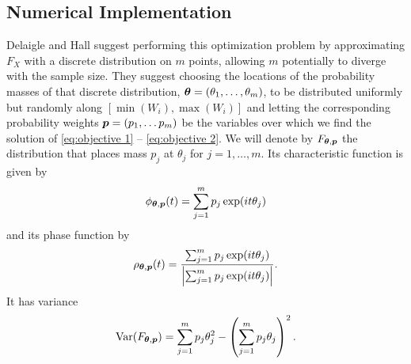	

	

	\subsection{Numerical Implementation}

	Delaigle and Hall \cite{Delaigle2016-la} suggest performing this optimization problem by approximating $F_X$ with a discrete distribution on $m$ points, allowing $m$ potentially to diverge with the sample size. They suggest choosing the locations of the probability masses of that discrete distribution, ${\bm{{\theta}}} = (\theta_1, \dots, \theta_m)$, to be distributed uniformly but randomly along $[\min(W_i), \max(W_i)]$ and letting the corresponding probability weights ${\bm{{p}}} = (p_1, \dots p_m)$ be the variables over which we find the solution of \eqref{eq:objective 1} -- \eqref{eq:objective 2}. We will denote by $F_{{\bm{{\theta}}}, {\bm{{p}}}}$ the distribution that places mass $p_j$ at $\theta_j$ for $j = 1,\dots, m$. Its characteristic function is given by
	\begin{equation}
		\phi_{{\bm{{\theta}}}, {\bm{{p}}}}(t) = \sum_{j = 1}^m p_j \exp(it\theta_j)
	\end{equation}
	and its phase function by
	\begin{equation}
		\rho_{{\bm{{\theta}}}, {\bm{{p}}}}(t) = \frac{ \sum_{j = 1}^m p_j \exp(it\theta_j)}{\left| \sum_{j = 1}^m p_j \exp(it\theta_j)\right|}.
	\end{equation}
	It has variance
	\begin{equation}
		\mathrm{Var}(F_{{\bm{{\theta}}}, {\bm{{p}}}}) = \sum_{j = 1}^m p_j \theta_j^2 - \left( \sum_{j=1}^m p_j \theta_j \right)^2.
	\end{equation}

